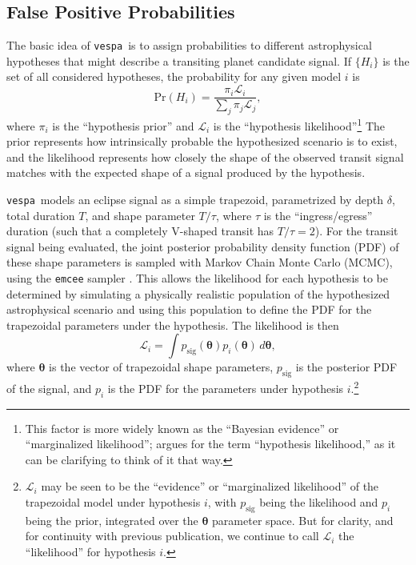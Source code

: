 \documentclass{emulateapj}
\newcommand{\eqlabel}[1]{\label{eq:#1}}
\newcommand{\sectlabel}[1]{\label{sect:#1}}
\newcommand{\vespa}{\texttt{vespa}}
\newcommand{\bvec}[1]{{\ensuremath{\boldsymbol{#1}}}}
\begin{document}

\subsection{False Positive Probabilities}
\sectlabel{methods:fpp}

The basic idea of \vespa\ is to assign probabilities to different
astrophysical hypotheses that might describe a transiting planet
candidate signal.  If $\{H_i\}$ is the set of all considered
hypotheses, the probability for any given model $i$ is
\begin{equation}
  \eqlabel{prob}
  \mathrm{Pr}\left(H_i\right) = \frac{\pi_i \mathcal
    L_i}{\displaystyle \sum_j \pi_j \mathcal L_j},
\end{equation}
where $\pi_i$ is the ``hypothesis prior'' and $\mathcal L_i$ is the
``hypothesis likelihood''\footnote{This factor is more widely known as
  the ``Bayesian evidence'' or ``marginalized likelihood'';
  \citet{Morton:2014b} argues for the term ``hypothesis likelihood,''
  as it can be clarifying to think of it that way.}
The prior represents how intrinsically probable the hypothesized
scenario is to exist, and the likelihood represents how closely the
shape of the observed transit signal matches with the expected shape
of a signal produced by the hypothesis.

\vespa\ models an eclipse signal as a simple trapezoid, parametrized
by depth $\delta$, total duration $T$, and shape parameter $T / \tau$,
where $\tau$ is the ``ingress/egress'' duration (such that a
completely V-shaped transit has $T/\tau = 2$).  For the transit signal
being evaluated, the joint posterior probability density function
(PDF) of these shape parameters is sampled with Markov Chain Monte
Carlo (MCMC), using the
\texttt{emcee} sampler \citep{emcee}.  This allows the likelihood for
each hypothesis to be determined by simulating a physically realistic
population of the hypothesized astrophysical scenario and using this
population to define the PDF for the trapezoidal parameters under the
hypothesis.  The likelihood is then
\begin{equation}
  \eqlabel{lhood}
  \mathcal L_i = \displaystyle \int p_\mathrm{sig}\left(\bvec{\theta}\right)
                                    p_i\left(\bvec{\theta}\right)\,d\bvec{\theta},
\end{equation}
where $\bvec{\theta}$ is the vector of trapezoidal shape parameters,
$p_\mathrm{sig}$ is the posterior PDF of the signal, and $p_i$ is the
PDF for the parameters under hypothesis $i$.\footnote{$\mathcal L_i$
  may be seen to be the ``evidence'' or ``marginalized likelihood'' of
  the trapezoidal model under hypothesis $i$, with $p_\mathrm{sig}$
  being the likelihood and $p_i$ being the prior, integrated over the
  $\bvec{\theta}$ parameter space.  But for clarity, and for
  continuity with previous publication, we continue to call $\mathcal
  L_i$ the ``likelihood'' for hypothesis $i$.}
\end{document}
